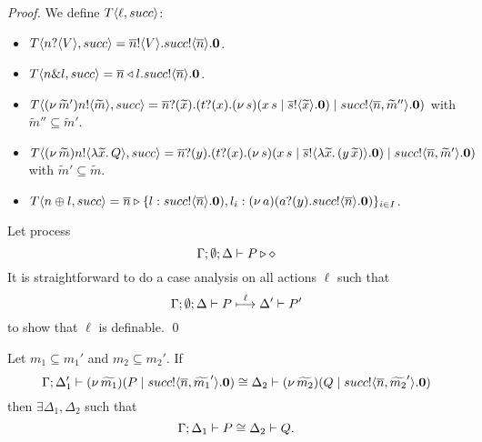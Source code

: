 \begin{proof}
	\noi We define $T\langle \ell, succ \rangle$:
%
	\begin{itemize}
		\item	$T\langle n ? \langle V \rangle, succ \rangle = \overline{n} ! \langle V \rangle . succ ! \langle \overline{n} \rangle . \mathbf{0}$.

		\item	$T\langle n \& l, succ \rangle = \overline{n} \triangleleft l . succ ! \langle \overline{n} \rangle . \mathbf{0}$.


		\item	$T\langle (\nu\, \widetilde{m}') n ! \langle \widetilde{m} \rangle, succ \rangle = \overline{n} ? (\widetilde{x}) . (t ? (x) . (\nu\, s)(x\, {s} \;|\; \overline{s} ! \langle \widetilde{x} \rangle . \mathbf{0}) \;|\; succ ! \langle \overline{n}, \widetilde{m}'' \rangle . \mathbf{0})$
			with $\widetilde{m}'' \subseteq \widetilde{m}'$.

		\item	$T\langle (\nu\, \widetilde{m}) n ! \langle \lambda \widetilde{x}.\,Q \rangle, succ \rangle = \overline{n} ? (y) . (t ? (x) . (\nu\, s)(x\, {s} \;|\; \overline{s} ! \langle \lambda \widetilde{x}.\,(y\, {\widetilde{x}}) \rangle . \mathbf{0}) \;|\; succ ! \langle \overline{n}, \widetilde{m}' \rangle . \mathbf{0})$ with $\widetilde{m}' \subseteq \widetilde{m}$.

		\item	$T\langle n \oplus l, succ \rangle = \overline{n} \triangleright \{l: succ ! \langle \overline{n} \rangle . \mathbf{0}), l_i: (\nu\, a)(a ? (y) . succ ! \langle \overline{n} \rangle . \mathbf{0})\}_{i \in I}$.
	\end{itemize}
		
	\noi Let process 
	\[
		\Gamma; \emptyset; \Delta \vdash P \triangleright \diamond
	\]
	\noi	It is straightforward to do a case analysis
			on all actions $\ell$ such that
			\[
				\Gamma; \emptyset; \Delta \vdash P \stackrel{\ell}{\longmapsto} \Delta' \vdash P'
			\]
			to show that $\ell$ is definable.
	\qed
\end{proof}


\begin{lemma}[Extrusion]\rm
	\label{lem:extrusion}
	Let $m_1 \subseteq m_1'$ and $m_2 \subseteq m_2'$. 
	If 
	\[
		\Gamma; \Delta_1' \vdash (\nu\, \widetilde{m_1})(P \;|\; succ ! \langle \overline{n}, \widetilde{m_1}' \rangle . \mathbf{0}) \cong \Delta_2 \vdash (\nu\, \widetilde{m_2})(Q \;|\; succ ! \langle \overline{n}, \widetilde{m_2}' \rangle . \mathbf{0})
	\]
	then $\exists \Delta_1, \Delta_2$ such that
	\[
		\Gamma; \Delta_1 \vdash P \cong \Delta_2 \vdash Q.
	\]
\end{lemma}

